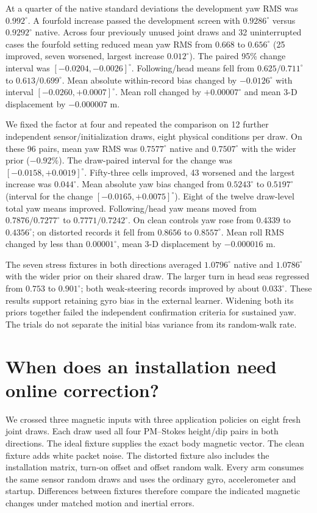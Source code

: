 At a quarter of the native standard deviations the development yaw RMS was $0.992^\circ$. A fourfold increase passed the development screen with $0.9286^\circ$ versus $0.9292^\circ$ native. Across four previously unused joint draws and 32 uninterrupted cases the fourfold setting reduced mean yaw RMS from $0.668$ to $0.656^\circ$ (25 improved, seven worsened, largest increase $0.012^\circ$). The paired 95\% change interval was $[-0.0204,-0.0026]^\circ$. Following/head means fell from $0.625/0.711^\circ$ to $0.613/0.699^\circ$. Mean absolute within-record bias changed by $-0.0126^\circ$ with interval $[-0.0260,+0.0007]^\circ$. Mean roll changed by $+0.00007^\circ$ and mean 3-D displacement by $-0.000007$ m.

We fixed the factor at four and repeated the comparison on 12 further independent sensor/initialization draws, eight physical conditions per draw. On these 96 pairs, mean yaw RMS was $0.7577^\circ$ native and $0.7507^\circ$ with the wider prior ($-0.92\%$). The draw-paired interval for the change was $[-0.0158,+0.0019]^\circ$. Fifty-three cells improved, 43 worsened and the largest increase was $0.044^\circ$. Mean absolute yaw bias changed from $0.5243^\circ$ to $0.5197^\circ$ (interval for the change $[-0.0165,+0.0075]^\circ$). Eight of the twelve draw-level total yaw means improved. Following/head yaw means moved from $0.7876/0.7277^\circ$ to $0.7771/0.7242^\circ$. On clean controls yaw rose from $0.4339$ to $0.4356^\circ$; on distorted records it fell from $0.8656$ to $0.8557^\circ$. Mean roll RMS changed by less than $0.00001^\circ$, mean 3-D displacement by $-0.000016$ m.

The seven stress fixtures in both directions averaged $1.0796^\circ$ native and $1.0786^\circ$ with the wider prior on their shared draw. The larger turn in head seas regressed from $0.753$ to $0.901^\circ$; both weak-steering records improved by about $0.033^\circ$. These results support retaining gyro bias in the external learner. Widening both its priors together failed the independent confirmation criteria for sustained yaw. The trials do not separate the initial bias variance from its random-walk rate.

\section{When does an installation need online correction?}
We crossed three magnetic inputs with three application policies on eight fresh joint draws. Each draw used all four PM--Stokes height/dip pairs in both directions. The ideal fixture supplies the exact body magnetic vector. The clean fixture adds white packet noise. The distorted fixture also includes the installation matrix, turn-on offset and offset random walk. Every arm consumes the same sensor random draws and uses the ordinary gyro, accelerometer and startup. Differences between fixtures therefore compare the indicated magnetic changes under matched motion and inertial errors.


